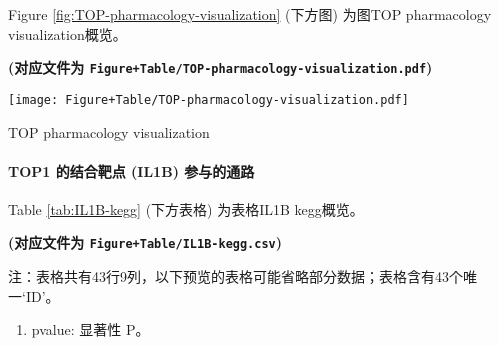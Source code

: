 \documentclass[
]{article}
\providecommand{\tightlist}{%
  \setlength{\itemsep}{0pt}\setlength{\parskip}{0pt}}
\begin{document}
Figure \ref{fig:TOP-pharmacology-visualization} (下方图) 为图TOP pharmacology visualization概览。

\textbf{(对应文件为 \texttt{Figure+Table/TOP-pharmacology-visualization.pdf})}

\def\@captype{figure}
\begin{center}
\texttt{[image: Figure+Table/TOP-pharmacology-visualization.pdf]}
\caption{TOP pharmacology visualization}\label{fig:TOP-pharmacology-visualization}
\end{center}

\hypertarget{top1-ux7684ux7ed3ux5408ux9776ux70b9-il1b-ux53c2ux4e0eux7684ux901aux8def}{%
\paragraph{TOP1 的结合靶点 (IL1B) 参与的通路}\label{top1-ux7684ux7ed3ux5408ux9776ux70b9-il1b-ux53c2ux4e0eux7684ux901aux8def}}

Table \ref{tab:IL1B-kegg} (下方表格) 为表格IL1B kegg概览。

\textbf{(对应文件为 \texttt{Figure+Table/IL1B-kegg.csv})}

\begin{center}\begin{tcolorbox}[colback=gray!10, colframe=gray!50, width=0.9\linewidth, arc=1mm, boxrule=0.5pt]注：表格共有43行9列，以下预览的表格可能省略部分数据；表格含有43个唯一`ID'。
\end{tcolorbox}
\end{center}
\begin{center}\begin{tcolorbox}[colback=gray!10, colframe=gray!50, width=0.9\linewidth, arc=1mm, boxrule=0.5pt]\begin{enumerate}\tightlist
\item pvalue:  显著性 P。
\end{enumerate}\end{tcolorbox}
\end{center}
\end{document}
